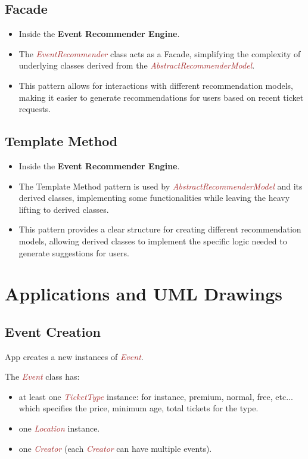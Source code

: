 \documentclass{article}
\newcommand{\designclass}[1]{\textit{\textcolor{brown}{#1}}}
\newcommand{\application}[1]{\textbf{\textcolor{codegreen}{#1}}}
\begin{document}
\FloatBarrier
\subsection{Facade}
\begin{itemize}
\item Inside the \application{Event Recommender Engine}.
\item The \designclass{EventRecommender} class acts as a Facade, simplifying the complexity of underlying classes derived from the \designclass{AbstractRecommenderModel}.
\item This pattern allows for interactions with different recommendation models, making it easier to generate recommendations for users based on recent ticket requests.
\end{itemize}

\FloatBarrier
\subsection{Template Method}
\begin{itemize}
\item Inside the \application{Event Recommender Engine}.
\item The Template Method pattern is used by \designclass{AbstractRecommenderModel} and its derived classes, implementing some functionalities while leaving the heavy lifting to derived classes.
\item This pattern provides a clear structure for creating different recommendation models, allowing derived classes to implement the specific logic needed to generate suggestions for users.
\end{itemize}

\FloatBarrier
\section{Applications and UML Drawings}
\FloatBarrier
\subsection{Event Creation}
App creates a new instances of \designclass{Event}.

The \designclass{Event} class has:
\begin{itemize}
    \item at least one \designclass{TicketType} instance: for instance, premium, normal, free, etc... which specifies the price, minimum age, total tickets for the type.
    \item one \designclass{Location} instance.
    \item one \designclass{Creator} (each \designclass{Creator} can have multiple events).
\end{itemize}
\end{document}
